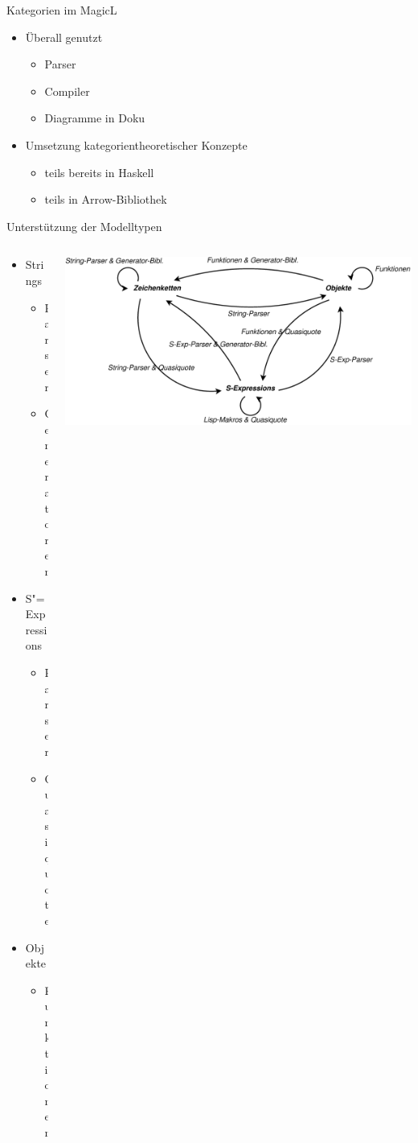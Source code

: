 \documentclass{beamer}
\newcommand{\sexps}{S"=Expressions}
\begin{document}
\begin{frame}{Kategorien im MagicL}
  \begin{itemize}
  \item Überall genutzt
    \begin{itemize}
    \item Parser
    \item Compiler
    \item Diagramme in Doku
    \end{itemize}
  \item Umsetzung kategorientheoretischer Konzepte
    \begin{itemize}
    \item teils bereits in Haskell
    \item teils in Arrow-Bibliothek
    \end{itemize}
  \end{itemize}
\end{frame}

\begin{frame}{Unterstützung der Modelltypen}
  \begin{columns}
    \begin{column}{3.5cm}
      \begin{itemize}
      \item Strings
        \begin{itemize}
        \item Parser
        \item Generatoren
        \end{itemize}
      \item \sexps
        \begin{itemize}
        \item Parser
        \item Quasiquote
        \end{itemize}
      \item Objekte
        \begin{itemize}
        \item Funktionen
        \end{itemize}
      \end{itemize}
    \end{column}
    \begin{column}{8cm}
      \includegraphics[scale=0.18]{images/magicl_model_support}
    \end{column}
  \end{columns}
\end{frame}
\end{document}
